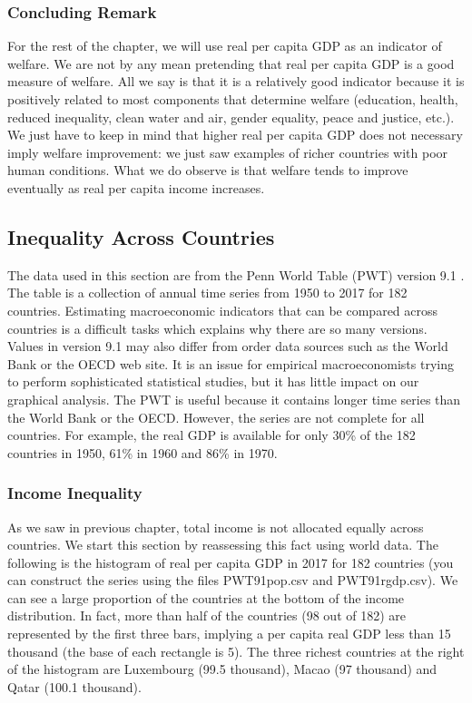 \documentclass[letterpaper]{article}\usepackage[]{graphicx}\usepackage[]{color}
\numberwithin{exer}{section}
\theoremstyle{nonumberplain}
\begin{document}
\subsubsection*{Concluding Remark}

For the rest of the chapter, we will use real per capita GDP as an
indicator of welfare. We are not by any mean pretending that real per
capita GDP is a good measure of welfare. All we say is that it is a
relatively good indicator because it is positively related to most
components that determine welfare (education, health, reduced
inequality, clean water and air, gender equality, peace and justice,
etc.). We just have to keep in mind that higher real per capita GDP
does not necessary imply welfare improvement: we just saw examples of
richer countries with poor human conditions. What we do observe is
that welfare tends to improve eventually as real per capita income
increases.

\subsection{Inequality Across Countries}

The data used in this section are from the Penn World Table (PWT)
version 9.1 \citep{pwt91}. The table is a collection of annual time
series from 1950 to 2017 for 182 countries. Estimating macroeconomic
indicators that can be compared across countries is a difficult tasks
which explains why there are so many versions. Values in version 9.1
may also differ from order data sources such as the World Bank or the
OECD web site. It is an issue for empirical macroeconomists trying to
perform sophisticated statistical studies, but it has little impact on
our graphical analysis. The PWT is useful because it contains longer
time series than the World Bank or the OECD. However, the series are
not complete for all countries. For example, the real GDP is available
for only 30\% of the 182 countries in 1950, 61\% in 1960 and 86\% in
1970. 

\subsubsection*{Income Inequality}


As we saw in previous chapter,  total income is not allocated equally
across countries. We start this section by reassessing this fact using
world data. The following is the histogram of real per capita GDP in
2017 for 182 countries (you can construct the series using the files
PWT91pop.csv and PWT91rgdp.csv). We can see a large proportion of the
countries at the bottom of the income distribution. In fact, more than
half of the countries (98 out of
182) are represented by the first three bars,
implying a per capita real GDP less than 15 thousand (the base of each
rectangle is 5).  The three richest countries at the right of the
histogram are Luxembourg (99.5 thousand), Macao
(97 thousand) and Qatar (100.1 thousand).
\end{document}
